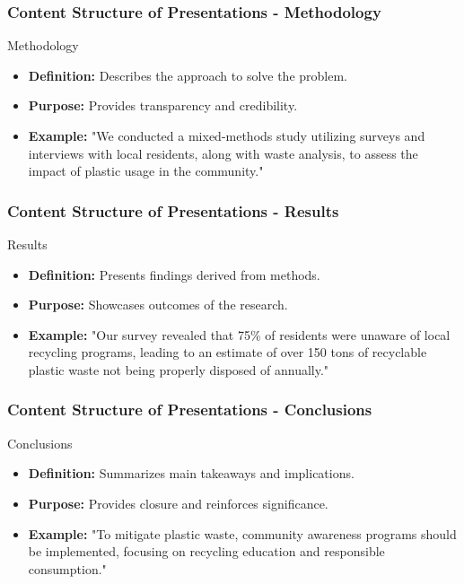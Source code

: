 \documentclass[aspectratio=169]{beamer}
\begin{document}
\begin{frame}[fragile]
    \frametitle{Content Structure of Presentations - Methodology}
    \begin{block}{Methodology}
        \begin{itemize}
            \item \textbf{Definition:} Describes the approach to solve the problem.
            \item \textbf{Purpose:} Provides transparency and credibility.
            \item \textbf{Example:} 
            "We conducted a mixed-methods study utilizing surveys and interviews with local residents, along with waste analysis, to assess the impact of plastic usage in the community."
        \end{itemize}
    \end{block}
\end{frame}

\begin{frame}[fragile]
    \frametitle{Content Structure of Presentations - Results}
    \begin{block}{Results}
        \begin{itemize}
            \item \textbf{Definition:} Presents findings derived from methods.
            \item \textbf{Purpose:} Showcases outcomes of the research.
            \item \textbf{Example:} 
            "Our survey revealed that 75\% of residents were unaware of local recycling programs, leading to an estimate of over 150 tons of recyclable plastic waste not being properly disposed of annually."
        \end{itemize}
    \end{block}
\end{frame}

\begin{frame}[fragile]
    \frametitle{Content Structure of Presentations - Conclusions}
    \begin{block}{Conclusions}
        \begin{itemize}
            \item \textbf{Definition:} Summarizes main takeaways and implications.
            \item \textbf{Purpose:} Provides closure and reinforces significance.
            \item \textbf{Example:} 
            "To mitigate plastic waste, community awareness programs should be implemented, focusing on recycling education and responsible consumption."
        \end{itemize}
    \end{block}
\end{frame}
\end{document}
